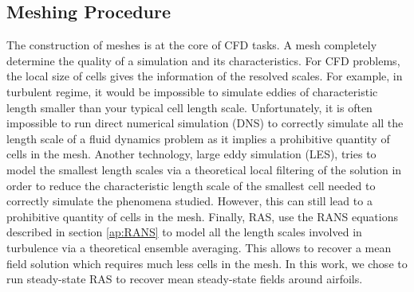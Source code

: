 \begin{subappendices}
	\section{Meshing Procedure}\label{ap:meshing}
	The construction of meshes is at the core of \acrshort{CFD} tasks. A mesh completely determine the quality of a simulation and its characteristics. For \acrshort{CFD} problems, the local size of cells gives the information of the resolved scales. For example, in turbulent regime, it would be impossible to simulate eddies of characteristic length smaller than your typical cell length scale. Unfortunately, it is often impossible to run direct numerical simulation (DNS) to correctly simulate all the length scale of a fluid dynamics problem as it implies a prohibitive quantity of cells in the mesh. Another technology, large eddy simulation (LES), tries to model the smallest length scales via a theoretical local filtering of the solution in order to reduce the characteristic length scale of the smallest cell needed to correctly simulate the phenomena studied. However, this can still lead to a prohibitive quantity of cells in the mesh. Finally, \acrfull{RAS}, use the \acrshort{RANS} equations described in section \ref{ap:RANS} to model all the length scales involved in turbulence via a theoretical ensemble averaging. This allows to recover a mean field solution which requires much less cells in the mesh. In this work, we chose to run steady-state \acrshort{RAS} to recover mean steady-state fields around airfoils.
	

\end{subappendices}
